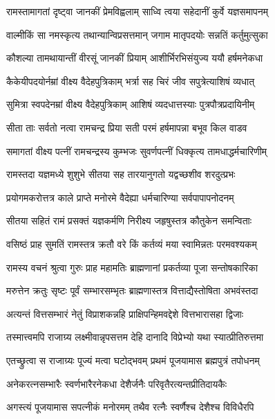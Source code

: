 \twolineshloka
{रामस्तामागतां दृष्ट्वा जानकीं प्रेमविह्वलाम्}
{साध्वि त्वया सहेदानीं कुर्वे यज्ञसमापनम्}%

\twolineshloka
{वाल्मीकिं सा नमस्कृत्य तथान्यान्विप्रसत्तमान्}
{जगाम मातृपदयोः सन्नतिं कर्तुमुत्सुका}%

\twolineshloka
{कौशल्या तामथायान्तीं वीरसूं जानकीं प्रियाम्}
{आशीर्भिरभिसंयुज्य ययौ हर्षमनेकधा}%

\twolineshloka
{कैकेयीपदयोर्नम्रां वीक्ष्य वैदेहपुत्रिकाम्}
{भर्त्रा सह चिरं जीव सपुत्रेत्याशिषं व्यधात्}%

\twolineshloka
{सुमित्रा स्वपदेनम्रां वीक्ष्य वैदेहपुत्रिकाम्}
{आशिषं व्यदधात्तस्याः पुत्रपौत्रप्रदायिनीम्}%

\twolineshloka
{सीता ताः सर्वतो नत्वा रामचन्द्र प्रिया सती}
{परमं हर्षमापन्ना बभूव किल वाडव}%

\twolineshloka
{समागतां वीक्ष्य पत्नीं रामचन्द्रस्य कुम्भजः}
{सुवर्णपत्नीं धिक्कृत्य तामधाद्धर्मचारिणीम्}%

\twolineshloka
{रामस्तदा यज्ञमध्ये शुशुभे सीतया सह}
{तारयानुगतो यद्वच्छशीव शरदुत्प्रभः}%

\twolineshloka
{प्रयोगमकरोत्तत्र काले प्राप्ते मनोरमे}
{वैदेह्या धर्मचारिण्या सर्वपापापनोदनम्}%

\twolineshloka
{सीतया सहितं रामं प्रसक्तं यज्ञकर्मणि}
{निरीक्ष्य जहृषुस्तत्र कौतुकेन समन्विताः}%

\twolineshloka
{वसिष्ठं प्राह सुमतिं रामस्तत्र क्रतौ वरे}
{किं कर्तव्यं मया स्वामिन्नतः परमवश्यकम्}%

\twolineshloka
{रामस्य वचनं श्रुत्वा गुरुः प्राह महामतिः}
{ब्राह्मणानां प्रकर्तव्या पूजा सन्तोषकारिका}%

\twolineshloka
{मरुत्तेन क्रतुः सृष्टः पूर्वं सम्भारसम्भृतः}
{ब्राह्मणास्तत्र वित्ताद्यैस्तोषिता अभवंस्तदा}%

\twolineshloka
{अत्यन्तं वित्तसम्भारं नेतुं विप्राशकन्नहि}
{प्राक्षिपन्हिमवद्देशे वित्तभारासहा द्विजाः}%

\twolineshloka
{तस्मात्त्वमपि राजाग्र्य लक्ष्मीवान्नृपसत्तम}
{देहि दानादि विप्रेभ्यो यथा स्यात्प्रीतिरुत्तमा}%

\twolineshloka
{एतच्छ्रुत्वा स राजाग्र्यः पूज्यं मत्वा घटोद्भवम्}
{प्रथमं पूजयामास ब्रह्मपुत्रं तपोधनम्}%

\twolineshloka
{अनेकरत्नसम्भारैः स्वर्णभारैरनेकधा}
{देशैर्जनैः परिवृतैरत्यन्तप्रीतिदायकैः}%

\twolineshloka
{अगस्त्यं पूजयामास सपत्नीकं मनोरमम्}
{तथैव रत्नैः स्वर्णैश्च देशैश्च विविधैरपि}%

